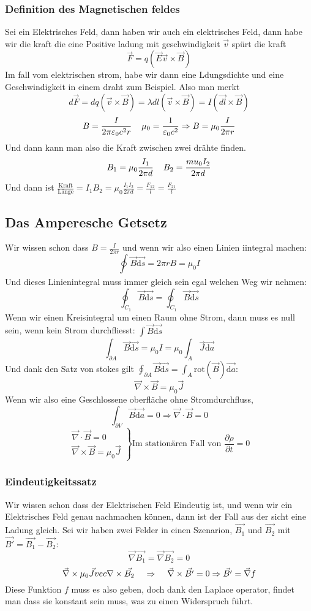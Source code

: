 \documentclass{article}
\newcommand{\mspc}{\hspace{0.4cm}}
\begin{document}
\subsubsection*{Definition des Magnetischen feldes}
Sei ein Elektrisches Feld, dann haben wir auch ein elektrisches Feld, dann habe wir die kraft die eine Positive ladung mit geschwindigkeit $\vec{v}$ spürt die kraft
\[\vec{F}=q(\vec{E}\vec{v}\times\vec{B})\]
Im fall vom elektrischen strom, habe wir dann eine Ldungsdichte und eine Geschwindigkeit in einem draht zum Beispiel. Also man merkt 
\[d \vec{F}=dq(\vec{v}\times \vec{B})=\lambda dl(\vec{v}\times \vec{B})=I(\vec{dl}\times \vec{B})\]
\[B=\frac{I}{2\pi \varepsilon_0 c^2 r}\mspc \mu_0=\frac{1}{\varepsilon_0 c^2}\Rightarrow B=\mu_0 \frac{I}{2\pi r}\]
Und dann kann man also die Kraft zwischen zwei drähte finden.
\[B_1=\mu_0 \frac{I_1}{2\pi d }\mspc B_2=\frac{mu_0 I_2}{2\pi d }\]
Und dann ist $\frac{\text{Kraft}}{\text{Länge}}=I_1B_2=\mu_0 \frac{I_1I_2}{2\pi d }=\frac{F_{12}}{l}=\frac{F_{21}}{l}$
\subsection*{Das Amperesche Getsetz}
Wir wissen schon dass $B=\frac{I }{2\pi r}$ und wenn wir also einen Linien iintegral machen:
\[\oint^{}_{}\vec{B}\vec{\text{d}s}=2\pi rB=\mu_0 I\]
Und dieses Linienintegral muss immer gleich sein egal welchen Weg wir nehmen:
\[\oint^{}_{C_1}\vec{B}\vec{\text{d}s}=\oint^{}_{C_1}\vec{B}\vec{\text{d}s}\]
Wenn wir einen Kreisintegral um einen Raum ohne Strom, dann muss es null sein, wenn kein Strom durchfliesst: $\int^{}_{}\vec{B}\vec{\text{d}s}$
\[\int^{}_{\partial A}\vec{B}\vec{\text{d}s}=\mu_0 I=\mu_0 \int^{}_{A}\vec{J}\vec{\text{d}a}\]
Und dank den Satz von stokes gilt $\oint^{}_{\partial A}\vec{B} \vec{\text{d}s}=\int^{}_{A}\text{rot}(\vec{B})\vec{\text{d}a}$:
\[\vec{\nabla}\times \vec{B}=\mu_0 \vec{J}\]
Wenn wir also eine Geschlossene oberfläche ohne Stromdurchfluss, 
\[\int^{}_{\partial V}\vec{B}\vec{\text{d}a}=0\Rightarrow \vec{\nabla}\cdot \vec{B}=0\]
\[\left.\begin{matrix}\vec{\nabla}\cdot \vec{B}=0\\ \vec{\nabla}\times \vec{B}=\mu_0 \vec{J}\end{matrix}\right\rbrace \text{Im stationären Fall von }\frac{\partial \rho}{\partial t}=0\]
\subsubsection*{Eindeutigkeitssatz} Wir wissen schon dass der Elektrischen Feld Eindeutig ist, und wenn wir ein Elektrisches Feld genau nachmachen können, dann ist der Fall aus der sicht eine Ladung gleich.
\newline Sei wir haben zwei Felder in einen Szenarion, $\vec{B_1}$ und $\vec{B_2}$ mit $\vec{B'}=\vec{B_1}-\vec{B_2}$:
\[\vec{\nabla}\vec{B_1}=\vec{\nabla}\vec{B_2}=0\]
\[\vec{\nabla}\times \mu_0 \vec{J}vec{\nabla}\times \vec{B_2}\mspc \Rightarrow \mspc \vec{\nabla}\times \vec{B'}=0 \Rightarrow \vec{B'}=\vec{\nabla} f\]
Diese Funktion $f$ muss es also geben, doch dank den Laplace operator, findet man dass sie konstant sein muss, was zu einen Widerspruch führt.
\end{document}
